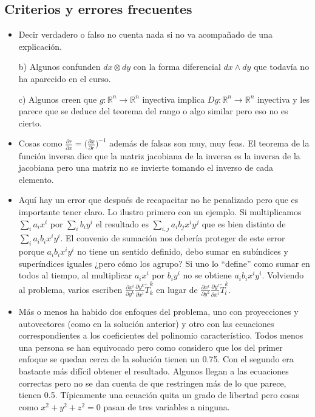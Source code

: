\subsection{Criterios y errores frecuentes}
\begin{itemize}
	\item Decir verdadero o falso no cuenta nada si no va acompañado de una explicación. 
	
	
	b) Algunos confunden $dx\otimes dy$ con la forma diferencial $dx\wedge dy$ que todavía no ha aparecido en el curso. 
	
	c) Algunos creen que $g:ℝ^n\longrightarrow ℝ^n$ inyectiva implica $Dg:ℝ^n\longrightarrow ℝ^n$ inyectiva y les parece que se deduce del teorema del rango o algo similar pero eso no es cierto.
	\item Cosas como $\frac{\partial r}{\partial x}=\big(\frac{\partial x}{\partial r}\big)^{-1}$ además de falsas son muy, muy feas.  El teorema de la función inversa dice que la matriz jacobiana de la inversa es la inversa de la jacobiana pero una matriz no se invierte tomando el inverso de cada elemento. 
	\item Aquí hay un error que después de recapacitar no he penalizado pero que es importante tener claro. Lo ilustro primero con un ejemplo. Si multiplicamos  $\sum_i a_i x^i$ por $\sum_i b_i y^i$ el resultado es  $\sum_{i,j} a_ib_j x^iy^j$ que es bien distinto de $\sum_{i} a_ib_i x^iy^i$. El convenio de sumación nos debería proteger de este error porque $a_ib_i x^iy^i$ no tiene un sentido definido, debo sumar en subíndices y superíndices iguales ¿pero cómo los agrupo? Si uno lo ``define'' como sumar en todos al tiempo, al multiplicar $a_ix^i$ por $b_iy^i$ no se obtiene $a_ib_i x^iy^i$. Volviendo al problema, varios escriben 
	$\frac{\partial x^i}{\partial y^k}
	\frac{\partial y^k}{\partial x^i}
	\widetilde{T}^k_k$
	en lugar de 
	$\frac{\partial x^i}{\partial y^k}
	\frac{\partial y^l}{\partial x^i}
	\widetilde{T}^k_l$. 
	\item Más o menos ha habido dos enfoques del problema, uno con proyecciones y autovectores (como en la solución anterior) y otro con las ecuaciones correspondientes a los coeficientes del polinomio característico. Todos menos una persona se han equivocado pero como considero que los del primer enfoque se quedan cerca de la solución  tienen un 0.75. Con el segundo era bastante más difícil obtener el resultado. Algunos llegan a las ecuaciones correctas pero no se dan cuenta de que restringen más de lo que parece, tienen 0.5. Típicamente una ecuación quita un grado de libertad pero cosas como $x^2+y^2+z^2=0$ pasan de tres variables a ninguna. 
\end{itemize}